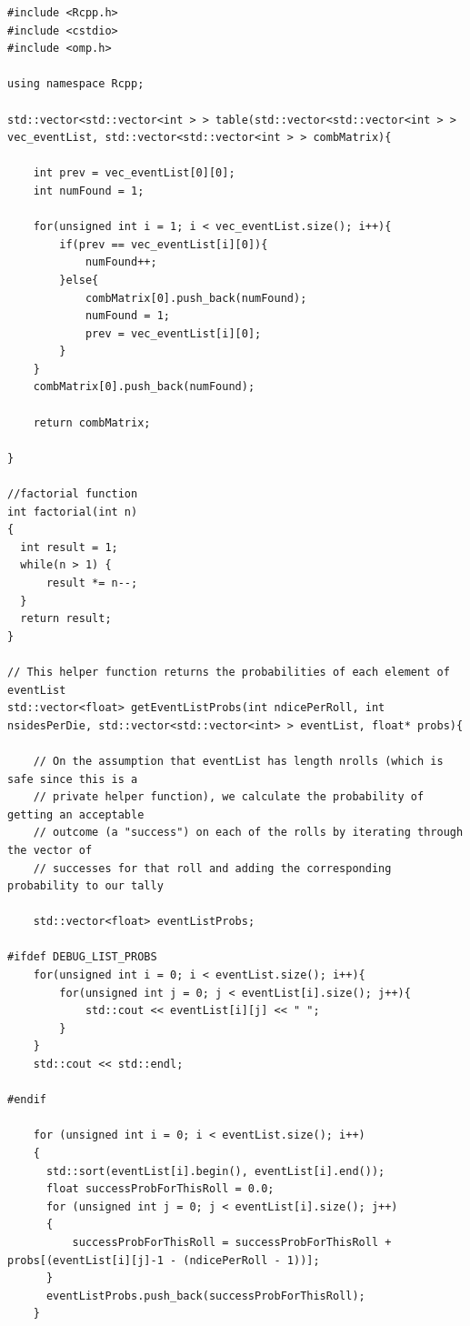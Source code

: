 \documentclass[12pt]{article}
\begin{document}
\begin{lstlisting}
#include <Rcpp.h>
#include <cstdio>
#include <omp.h>

using namespace Rcpp;

std::vector<std::vector<int > > table(std::vector<std::vector<int > > vec_eventList, std::vector<std::vector<int > > combMatrix){

    int prev = vec_eventList[0][0];
    int numFound = 1;

    for(unsigned int i = 1; i < vec_eventList.size(); i++){
        if(prev == vec_eventList[i][0]){
            numFound++;
        }else{
            combMatrix[0].push_back(numFound);
            numFound = 1;
            prev = vec_eventList[i][0];
        }
    }
    combMatrix[0].push_back(numFound);

    return combMatrix;

}

//factorial function
int factorial(int n)
{
  int result = 1;
  while(n > 1) {
      result *= n--;
  }
  return result;
}

// This helper function returns the probabilities of each element of eventList
std::vector<float> getEventListProbs(int ndicePerRoll, int nsidesPerDie, std::vector<std::vector<int> > eventList, float* probs){

    // On the assumption that eventList has length nrolls (which is safe since this is a
    // private helper function), we calculate the probability of getting an acceptable
    // outcome (a "success") on each of the rolls by iterating through the vector of
    // successes for that roll and adding the corresponding probability to our tally

    std::vector<float> eventListProbs;

#ifdef DEBUG_LIST_PROBS
    for(unsigned int i = 0; i < eventList.size(); i++){
        for(unsigned int j = 0; j < eventList[i].size(); j++){
            std::cout << eventList[i][j] << " ";
        }
    }
    std::cout << std::endl;

#endif

    for (unsigned int i = 0; i < eventList.size(); i++)
    {
      std::sort(eventList[i].begin(), eventList[i].end());
      float successProbForThisRoll = 0.0;
      for (unsigned int j = 0; j < eventList[i].size(); j++)
      {
          successProbForThisRoll = successProbForThisRoll + probs[(eventList[i][j]-1 - (ndicePerRoll - 1))];
      }
      eventListProbs.push_back(successProbForThisRoll);
    }


\end{lstlisting}
\end{document}
